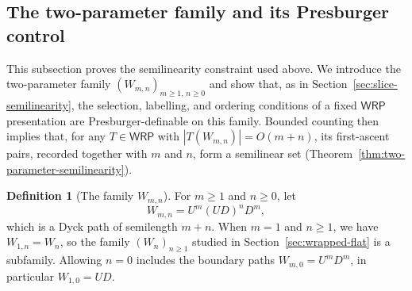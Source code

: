 \documentclass[11pt]{article}
\theoremstyle{definition}
\newtheorem{definition}[theorem]{Definition}
\newcommand{\WRP}{\mathsf{WRP}}
\begin{document}
\subsection{The two-parameter family and its Presburger control}

This subsection proves the semilinearity constraint used above.  We introduce
the two-parameter family $(W_{m,n})_{m\ge1,\,n\ge0}$ and show that, as in
Section~\ref{sec:slice-semilinearity}, the selection, labelling, and ordering
conditions of a fixed $\WRP$ presentation are Presburger-definable on this
family.  Bounded counting then implies that,
for any $T\in\WRP$ with $|T(W_{m,n})|=O(m+n)$, its first-ascent pairs,
recorded together with $m$ and $n$, form a semilinear set
(Theorem~\ref{thm:two-parameter-semilinearity}).

\begin{definition}[The family $W_{m,n}$]\label{def:two-parameter-family}
For $m\ge 1$ and $n\ge 0$, let
\[
   W_{m,n}=U^m(UD)^nD^m,
\]
which is a Dyck path of semilength $m+n$.  When $m=1$ and $n\ge1$, we have
$W_{1,n}=W_n$, so the family $(W_n)_{n\ge1}$ studied in
Section~\ref{sec:wrapped-flat} is a subfamily.  Allowing $n=0$ includes the
boundary paths $W_{m,0}=U^mD^m$, in particular $W_{1,0}=UD$.
\end{definition}
\end{document}
